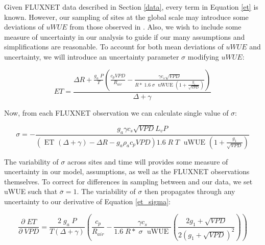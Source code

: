 \documentclass[draft,linenumbers]{agujournal}
\begin{document}
Given FLUXNET data described in Section \ref{data}, every term in Equation \ref{et} is known. However, our sampling of sites at the global scale may introduce some deviations of $uWUE$ from those observed in \citet{Zhou_2015}. Also, we wish to include some measure of uncertainty in our analysis to guide if our many assumptions and simplifications are reasonable. To account for both mean deviations of $uWUE$ and uncertainty, we will introduce an uncertainty parameter $\sigma$ modifying $uWUE$:

\begin{linenomath*}
  \begin{equation}
    ET = \frac{\Delta R + \frac{g_a\; P}{T} \left( \frac{ c_p VPD}{R_{air}} -  \frac{\gamma c_s \sqrt{VPD} }{ R* \; 1.6\; \sigma \; \text{ uWUE } (1 + \frac{g_1}{\sqrt{VPD}})} \right) }{ \Delta + \gamma}
    \label{et_sigma}
  \end{equation}
\end{linenomath*}

Now, from each FLUXNET observation we can calculate single value of $\sigma$:

\begin{linenomath*}
  \begin{equation}
\sigma = - \frac{g_a \gamma c_s \sqrt{VPD} L_v P }{ \left(\text{ ET } ( \Delta + \gamma) - \Delta R - g_a \rho_a c_p VPD\right) 1.6 \; R\; T\; \text{ uWUE } (1 + \frac{g_1}{\sqrt{VPD}})}
    \label{sigma}
  \end{equation}
\end{linenomath*}

The variability of $\sigma$ across sites and time will provides some measure of uncertainty in our model, assumptions, as well as the FLUXNET observations themselves. To correct for differences in sampling between \cite{Zhou_2015} and our data, we set uWUE such that $\overline{\sigma} = 1$. The variability of $\sigma$ then propagates through any uncertainty to our derivative of Equation \ref{et_sigma}:

\begin{linenomath*}
  \begin{equation}
    \frac{\partial \;  ET}{\partial \; VPD} = \frac{2\; g_a \; P}{T(\Delta + \gamma)}   \left(\frac{ c_p}{R_{air}} -  \frac{\gamma c_s }{1.6 \; R*\; \sigma \; \text{ uWUE }} \left( \frac{2 g_1 + \sqrt{VPD}}{2 (g_1 + \sqrt{VPD})^2}\right) \right)
    \label{d_et}
  \end{equation}
\end{linenomath*}
\end{document}
